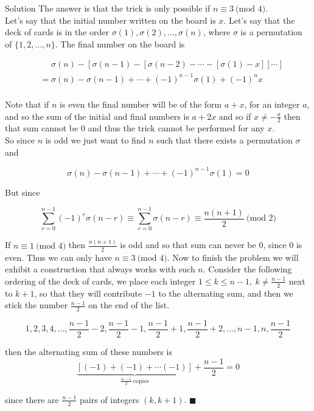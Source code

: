 \documentclass{article}
\begin{document}
\begin{solution}{Solution}
The answer is that the trick is only possible if
$n \equiv 3 \ \text{(mod } 4)$. \\

Let's say that the initial number written on the board is $x$. Let's say
that the deck of cards is in the order $\sigma(1), \sigma(2), \ldots,
\sigma(n)$, where $\sigma$ is a permutation of $\{1,2,\ldots, n\}$. The
final number on the board is

\[
\begin{aligned}
&\phantom{=} \sigma(n) - \left[ \sigma(n-1) - \left[ \sigma(n-2) -
\cdots - \left[ \sigma(1) - x \right] \right] \cdots \right] \\
&= \sigma(n) - \sigma(n-1) + \cdots + (-1)^{n-1} \sigma(1) + (-1)^n x \\
\end{aligned}
\]

Note that if $n$ is even the final number will be of the form $a + x$, for
an integer $a$, and so the sum of the initial and final numbers is $a + 2x$
and so if $x \neq -\frac{a}{2}$ then that sum cannot be 0 and thus the trick
cannot be performed for any $x$. \\

So since $n$ is odd we just want to find $n$ such that there exists a
permutation $\sigma$ and

$$
\sigma(n) - \sigma(n-1) + \cdots + (-1)^{n-1} \sigma(1) = 0
$$

But since

$$
\sum_{r=0}^{n-1} (-1)^r \sigma(n-r) \equiv
\sum_{r=0}^{n-1} \sigma(n-r) \equiv
\frac{n(n+1)}{2} \ \text{(mod } 2)
$$

If $n \equiv 1 \ \text{(mod } 4)$ then $\frac{n(n+1)}{2}$ is odd and so
that sum can never be 0, since 0 is even. Thus we can only have
$n \equiv 3 \ \text{(mod } 4)$. Now to finish the problem we will exhibit
a construction that always works with such $n$. Consider the following
ordering of the deck of cards, we place each integer $1\leq k \leq n-1, \
k \neq \frac{n-1}{2}$ next to $k+1$, so that they will contribute $-1$
to the alternating sum, and then we stick the number $\frac{n-1}{2}$ on the
end of the list.

$$
1, 2, 3, 4, \ldots, \frac{n-1}{2} - 2, \frac{n-1}{2} - 1,  \frac{n-1}{2} + 1, \frac{n-1}{2} + 2, \ldots, n-1, n, \frac{n-1}{2}
$$

then the alternating sum of these numbers is
$$
\underbrace{\left[ (-1) + (-1) + \cdots (-1) \right]}_{\frac{n-1}{2} \ \text{copies}} + \frac{n-1}{2} = 0
$$

since there are $\frac{n-1}{2}$ pairs of integers $(k, k+1)$. $\blacksquare$
\end{solution}
\end{document}
